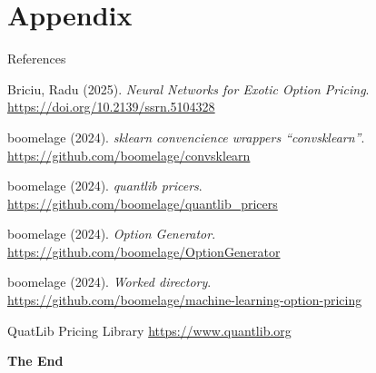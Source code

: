 \documentclass[aspectratio=169,xcolor=dvipsnames]{beamer}
\begin{document}
	\section{Appendix}
		\begin{frame}{References}
			\begin{thebibliography}{9}
				 Briciu, Radu (2025). \emph{Neural Networks for Exotic Option Pricing}. \url{https://doi.org/10.2139/ssrn.5104328}
				
				 boomelage (2024). \emph{sklearn convencience wrappers ``convsklearn''}. \\ \url{https://github.com/boomelage/convsklearn}
				
				 boomelage (2024). \emph{quantlib pricers}. \\
				\url{https://github.com/boomelage/quantlib_pricers}
				
				 boomelage (2024). \emph{Option Generator}. \\
				\url{https://github.com/boomelage/OptionGenerator}
				
				 boomelage (2024). \emph{Worked directory}. \\
				\url{https://github.com/boomelage/machine-learning-option-pricing}
				
				 QuatLib Pricing Library \url{https://www.quantlib.org}
				
			\end{thebibliography}
		\end{frame}
		
		
		\begin{frame}
			\Huge{\centerline{\textbf{The End}}}
		\end{frame}
	
\end{document}
